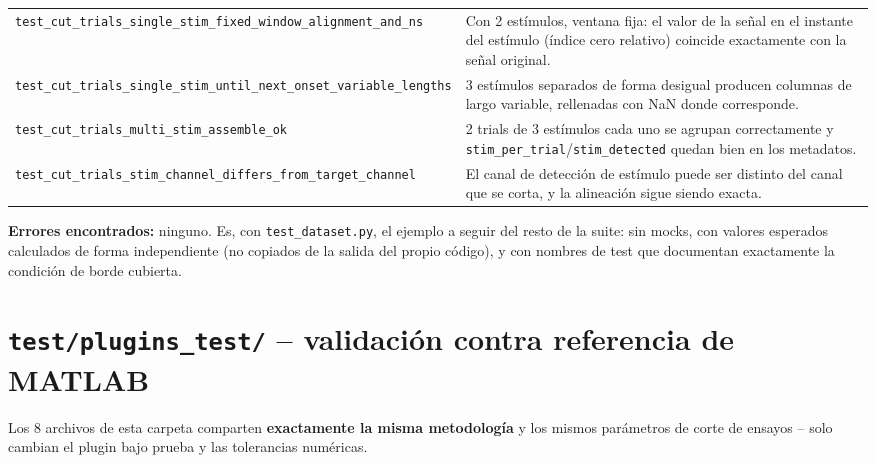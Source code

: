 \documentclass[11pt,a4paper]{article}
\begin{document}
\begin{center}
\begin{longtable}{L{6.3cm}L{8.2cm}}
\texttt{test\_\allowbreak cut\_\allowbreak trials\_\allowbreak single\_\allowbreak stim\_\allowbreak fixed\_\allowbreak window\_\allowbreak alignment\_\allowbreak and\_\allowbreak ns} & Con 2 estímulos, ventana fija: el valor de la señal en el instante del estímulo (índice cero relativo) coincide exactamente con la señal original. \\
\texttt{test\_\allowbreak cut\_\allowbreak trials\_\allowbreak single\_\allowbreak stim\_\allowbreak until\_\allowbreak next\_\allowbreak onset\_\allowbreak variable\_\allowbreak lengths} & 3 estímulos separados de forma desigual producen columnas de largo variable, rellenadas con NaN donde corresponde. \\
\texttt{test\_\allowbreak cut\_\allowbreak trials\_\allowbreak multi\_\allowbreak stim\_\allowbreak assemble\_\allowbreak ok} & 2 trials de 3 estímulos cada uno se agrupan correctamente y \texttt{stim\_\allowbreak per\_\allowbreak trial}/\texttt{stim\_\allowbreak detected} quedan bien en los metadatos. \\
\texttt{test\_\allowbreak cut\_\allowbreak trials\_\allowbreak stim\_\allowbreak channel\_\allowbreak differs\_\allowbreak from\_\allowbreak target\_\allowbreak channel} & El canal de detección de estímulo puede ser distinto del canal que se corta, y la alineación sigue siendo exacta. \\
\bottomrule
\end{longtable}
\end{center}

\textbf{Errores encontrados:} ninguno. Es, con \texttt{test\_\allowbreak dataset.py}, el ejemplo a seguir del resto de la
suite: sin mocks, con valores esperados calculados de forma independiente (no copiados de la salida del
propio código), y con nombres de test que documentan exactamente la condición de borde cubierta.

\newpage
\section{\texttt{test/plugins\_\allowbreak test/} -- validación contra referencia de MATLAB}
\label{sec:plugins-test}

Los 8 archivos de esta carpeta comparten \textbf{exactamente la misma metodología} y los mismos parámetros
de corte de ensayos -- solo cambian el plugin bajo prueba y las tolerancias numéricas.
\end{document}
